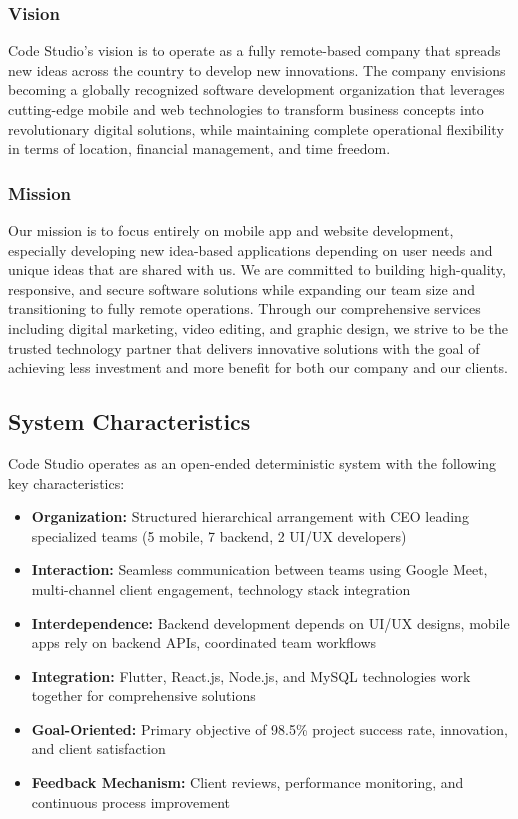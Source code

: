 \documentclass[12pt,a4paper]{article}
\begin{document}
\subsubsection{Vision}
Code Studio's vision is to operate as a fully remote-based company that spreads new ideas across the country to develop new innovations. The company envisions becoming a globally recognized software development organization that leverages cutting-edge mobile and web technologies to transform business concepts into revolutionary digital solutions, while maintaining complete operational flexibility in terms of location, financial management, and time freedom.

\subsubsection{Mission}
Our mission is to focus entirely on mobile app and website development, especially developing new idea-based applications depending on user needs and unique ideas that are shared with us. We are committed to building high-quality, responsive, and secure software solutions while expanding our team size and transitioning to fully remote operations. Through our comprehensive services including digital marketing, video editing, and graphic design, we strive to be the trusted technology partner that delivers innovative solutions with the goal of achieving less investment and more benefit for both our company and our clients.


\subsection{System Characteristics}

Code Studio operates as an open-ended deterministic system with the following key characteristics:

\begin{itemize}
    \item \textbf{Organization:} Structured hierarchical arrangement with CEO leading specialized teams (5 mobile, 7 backend, 2 UI/UX developers)
    \item \textbf{Interaction:} Seamless communication between teams using Google Meet, multi-channel client engagement, technology stack integration
    \item \textbf{Interdependence:} Backend development depends on UI/UX designs, mobile apps rely on backend APIs, coordinated team workflows
    \item \textbf{Integration:} Flutter, React.js, Node.js, and MySQL technologies work together for comprehensive solutions
    \item \textbf{Goal-Oriented:} Primary objective of 98.5\% project success rate, innovation, and client satisfaction
    \item \textbf{Feedback Mechanism:} Client reviews, performance monitoring, and continuous process improvement
\end{itemize}
\end{document}
